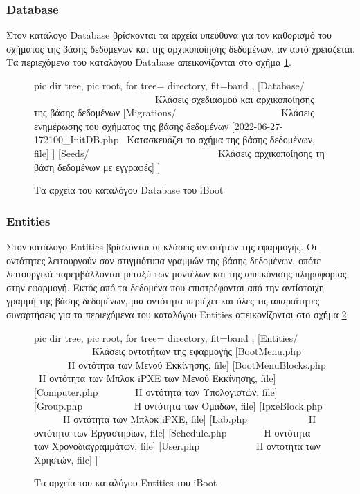 \subsubsection{Database} \label{ui:app:database}
Στον κατάλογο Database βρίσκονται τα αρχεία υπεύθυνα για τον καθορισμό του σχήματος της βάσης δεδομένων και της αρχικοποίησης δεδομένων, αν αυτό χρειάζεται. Τα περιεχόμενα του καταλόγου Database απεικονίζονται στο σχήμα \ref{dir:iBoot-Database}.

\begin{figure}
	\centering
	{\footnotesize
		\begin{forest}
			pic dir tree,
			pic root,
			for tree={%
				directory,
				fit=band
			},
			[Database/ \ \ \ \ \ \ \ \ \ \ \ \ \ \ \ \ \ \ \ \ \ \ \ \ \ Κλάσεις σχεδιασμού και αρχικοποίησης της βάσης δεδομένων
				[Migrations/ \ \ \ \ \ \ \ \ \ \ \ \ \ \ \ \ \ \ \ \ \ Κλάσεις ενημέρωσης του σχήματος της βάσης δεδομένων
					[2022-06-27-172100\_InitDB.php \ Κατασκευάζει το σχήμα της βάσης δεδομένων, file]
				]
				[Seeds/ \ \ \ \ \ \ \ \ \ \ \ \ \ \ \ \ \ \ \ \ \ \ \ \ \ \ Κλάσεις αρχικοποίησης τη βάση δεδομένων με εγγραφές]
			]
		\end{forest}
	}
	\caption{Τα αρχεία του καταλόγου Database του iBoot}
	\label{dir:iBoot-Database}
\end{figure}

\subsubsection{Entities} \label{ui:app:entities}
Στον κατάλογο Entities βρίσκονται οι κλάσεις οντοτήτων της εφαρμογής. Οι οντότητες λειτουργούν σαν στιγμιότυπα γραμμών της βάσης δεδομένων, οπότε λειτουργικά παρεμβάλλονται μεταξύ των μοντέλων και της απεικόνισης πληροφορίας στην εφαρμογή. Εκτός από τα δεδομένα που επιστρέφονται από την αντίστοιχη γραμμή της βάσης δεδομένων, μια οντότητα περιέχει και όλες τις απαραίτητες συναρτήσεις για τα περιεχόμενα του καταλόγου Entities απεικονίζονται στο σχήμα \ref{dir:iBoot-Entities}.

\begin{figure}
	\centering
	{\footnotesize
		\begin{forest}
			pic dir tree,
			pic root,
			for tree={%
				directory,
				fit=band
			},
			[Entities/ \ \ \ \ \ \ \ \ \ \ \ \ Κλάσεις οντοτήτων της εφαρμογής
				[BootMenu.php \ \ \ \ \ \ \ Η οντότητα των Μενού Εκκίνησης, file]
				[BootMenuBlocks.php \ Η οντότητα των Μπλοκ iPXE των Μενού Εκκίνησης, file]
				[Computer.php \ \ \ \ \ \ \ Η οντότητα των Υπολογιστών, file]
				[Group.php \ \ \ \ \ \ \ \ \ \ Η οντότητα των Ομάδων, file]
				[IpxeBlock.php \ \ \ \ \ \ Η οντότητα των Μπλοκ iPXE, file]
				[Lab.php \ \ \ \ \ \ \ \ \ \ \ \ Η οντότητα των Εργαστηρίων, file]
				[Schedule.php \ \ \ \ \ \ \ Η οντότητα των Χρονοδιαγραμμάτων, file]
				[User.php \ \ \ \ \ \ \ \ \ \ \ Η οντότητα των Χρηστών, file]
			]
		\end{forest}
	}
	\caption{Τα αρχεία του καταλόγου Entities του iBoot}
	\label{dir:iBoot-Entities}
\end{figure}

